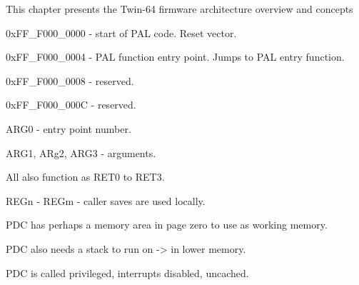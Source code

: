 This chapter presents the Twin-64 firmware architecture overview and concepts 






0xFF\_F000\_0000 - start of PAL code. Reset vector. 

0xFF\_F000\_0004 - PAL function entry point. Jumps to PAL entry function.

0xFF\_F000\_0008 - reserved.

0xFF\_F000\_000C - reserved.


ARG0 - entry point number.

ARG1, ARg2, ARG3 - arguments.

All also function as RET0 to RET3.

REGn - REGm - caller saves are used locally.

PDC has perhaps a memory area in page zero to use as working memory.

PDC also needs a stack to run on -> in lower memory.

PDC is called privileged, interrupts disabled, uncached.


 